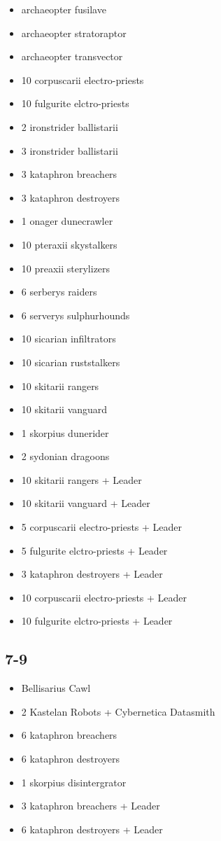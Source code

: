 \documentclass{HordeModeTarot}
\begin{document}
\begin{multicols}{2}
\begin{itemize}[leftmargin=*]
\item[] archaeopter fusilave
\item[] archaeopter stratoraptor
\item[] archaeopter transvector
\item[] 10 corpuscarii electro-priests
\item[] 10 fulgurite elctro-priests
\item[] 2 ironstrider ballistarii
\item[] 3 ironstrider ballistarii
\item[] 3 kataphron breachers
\item[] 3 kataphron destroyers
\item[] 1 onager dunecrawler
\item[] 10 pteraxii skystalkers
\item[] 10 preaxii sterylizers
\item[] 6 serberys raiders
\item[] 6 serverys sulphurhounds
\item[] 10 sicarian infiltrators
\item[] 10 sicarian ruststalkers
\item[] 10 skitarii rangers
\item[] 10 skitarii vanguard
\item[] 1 skorpius dunerider
\item[] 2 sydonian dragoons
\item[] 10 skitarii rangers + Leader
\item[] 10 skitarii vanguard + Leader
\item[] 5 corpuscarii electro-priests + Leader
\item[] 5 fulgurite elctro-priests + Leader
\item[] 3 kataphron destroyers + Leader
\item[] 10 corpuscarii electro-priests + Leader
\item[] 10 fulgurite elctro-priests + Leader
\end{itemize}

\subsection*{7-9}

\begin{itemize}[leftmargin=*]
\item[] Bellisarius Cawl
\item[] 2 Kastelan Robots + Cybernetica Datasmith
\item[] 6 kataphron breachers
\item[] 6 kataphron destroyers
\item[] 1 skorpius disintergrator
\item[] 3 kataphron breachers + Leader
\item[] 6 kataphron destroyers + Leader
\end{itemize}


\end{multicols}
\end{document}
